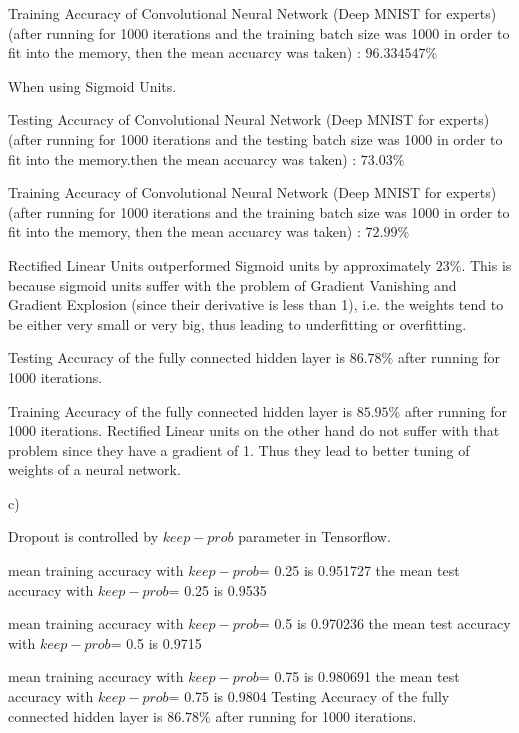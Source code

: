 \documentclass[]{article}
\begin{document}
Training Accuracy of Convolutional Neural Network (Deep MNIST for experts) (after running for 1000 iterations and the training batch size was 1000 in order to fit into the memory, then the mean accuarcy was taken) : $96.334547\%$

\bigskip

When using Sigmoid Units.


Testing Accuracy of Convolutional Neural Network (Deep MNIST for experts) (after running for 1000 iterations and the testing batch size was 1000 in order to fit into the memory.then the mean accuarcy was taken) : $73.03\%$

\bigskip

Training Accuracy of Convolutional Neural Network (Deep MNIST for experts) (after running for 1000 iterations and the training batch size was 1000 in order to fit into the memory, then the mean accuarcy was taken) : $72.99\%$

\bigskip

Rectified Linear Units outperformed Sigmoid units by approximately $23\%$.
This is because sigmoid units suffer with the problem of Gradient Vanishing and Gradient Explosion (since their derivative is less than 1), i.e. the weights tend to be either very small or very big, thus leading to underfitting or overfitting.

\bigskip
Testing Accuracy of the fully connected hidden layer is $86.78\%$ after running for 1000 iterations.

Training Accuracy of the fully connected hidden layer is $85.95\%$ after running for 1000 iterations.
Rectified Linear units on the other hand do not suffer with that problem since they have a gradient of 1. Thus they lead to better tuning of weights of a  neural network.

\bigskip

c)
\bigskip

Dropout is controlled by $keep-prob$ parameter in Tensorflow.

mean training accuracy with $keep -prob$= 0.25  is   0.951727
the mean test accuracy with $keep -prob$=  0.25  is  0.9535 

\bigskip

mean training accuracy with $keep- prob$= 0.5  is   0.970236
the mean test accuracy with $keep- prob$=  0.5  is  0.9715 

\bigskip

mean training accuracy with $keep- prob$= 0.75  is   0.980691
the mean test accuracy with $keep- prob$=  0.75  is  0.9804
Testing Accuracy of the fully connected hidden layer is $86.78\%$ after running for 1000 iterations.
\end{document}
